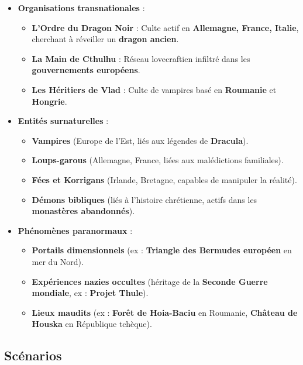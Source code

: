 \documentclass[10pt,a5paper,twoside]{book}
\begin{document}
\begin{itemize}
	\item \textbf{Organisations transnationales} :
	\begin{itemize}
		\item \textbf{L'Ordre du Dragon Noir} : Culte actif en \textbf{Allemagne, France, Italie}, cherchant à réveiller un \textbf{dragon ancien}.
		\item \textbf{La Main de Cthulhu} : Réseau lovecraftien infiltré dans les \textbf{gouvernements européens}.
		\item \textbf{Les Héritiers de Vlad} : Culte de vampires basé en \textbf{Roumanie} et \textbf{Hongrie}.
	\end{itemize}
	\item \textbf{Entités surnaturelles} :
	\begin{itemize}
		\item \textbf{Vampires} (Europe de l'Est, liés aux légendes de \textbf{Dracula}).
		\item \textbf{Loups-garous} (Allemagne, France, liées aux malédictions familiales).
		\item \textbf{Fées et Korrigans} (Irlande, Bretagne, capables de manipuler la réalité).
		\item \textbf{Démons bibliques} (liés à l'histoire chrétienne, actifs dans les \textbf{monastères abandonnés}).
	\end{itemize}
	\item \textbf{Phénomènes paranormaux} :
	\begin{itemize}
		\item \textbf{Portails dimensionnels} (ex : \textbf{Triangle des Bermudes européen} en mer du Nord).
		\item \textbf{Expériences nazies occultes} (héritage de la \textbf{Seconde Guerre mondiale}, ex : \textbf{Projet Thule}).
		\item \textbf{Lieux maudits} (ex : \textbf{Forêt de Hoia-Baciu} en Roumanie, \textbf{Château de Houska} en République tchèque).
	\end{itemize}
\end{itemize}

\newpage

\subsection{Scénarios}
\end{document}
